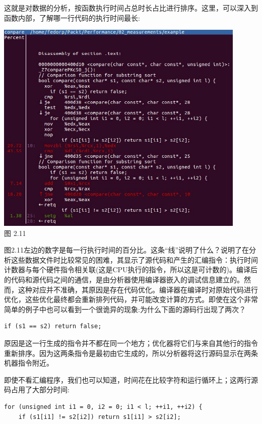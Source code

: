 这就是对数据的分析，按函数执行时间占总时长占比进行排序。这里，可以深入到函数内部，了解哪一行代码的执行时间最长:

\begin{center}
\includegraphics[width=0.9\textwidth]{content/1/chapter2/images/11.jpg}\\
图 2.11
\end{center}

图2.11左边的数字是每一行执行时间的百分比。这条“线”说明了什么？说明了在分析这些数据文件时比较常见的困难，其显示了源代码和产生的汇编指令：执行时间计数器与每个硬件指令相关联(这是CPU执行的指令，所以这是可计数的)。编译后的代码和源代码之间的通信，是由分析器使用编译器嵌入的调试信息建立的。然而，这种对应并不准确，其原因是存在代码优化。编译器在编译时对原始代码进行优化，这些优化最终都会重新排列代码，并可能改变计算的方式。即使在这个非常简单的例子中也可以看到一个很诡异的现象:为什么下面的源码行出现了两次？

\begin{lstlisting}[style=styleCXX]
if (s1 == s2) return false;
\end{lstlisting}

原因是这一行生成的指令并不都在同一个地方；优化器将它们与来自其他行的指令重新排序。因为这两条指令是最初由它生成的，所以分析器将这行源码显示在两条机器指令附近。

即使不看汇编程序，我们也可以知道，时间花在比较字符和运行循环上；这两行源码占用了大部分时间:

\begin{lstlisting}[style=styleCXX]
for (unsigned int i1 = 0, i2 = 0; i1 < l; ++i1, ++i2) {
	if (s1[i1] != s2[i2]) return s1[i1] > s2[i2];
\end{lstlisting}

